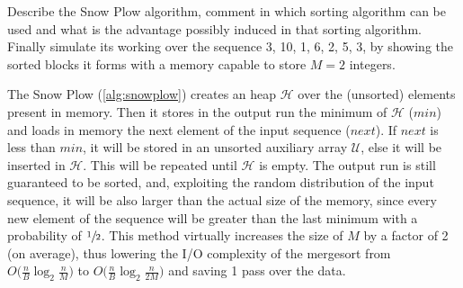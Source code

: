 \exercise

Describe the Snow Plow algorithm, comment in which sorting algorithm can be used
and what is the advantage possibly induced in that sorting algorithm. Finally
simulate its working over the sequence 3, 10, 1, 6, 2, 5, 3, by showing the
sorted blocks it forms with a memory capable to store $M = 2$ integers.

\solution

The Snow Plow (\autoref{alg:snowplow}) creates an heap $\mathcal{H}$ over the
(unsorted) elements present in memory. Then it stores in the output run the
minimum of $\mathcal{H}$ ($min$) and loads in memory the next element of the
input sequence ($next$). If $next$ is less than $min$, it will be stored in an
unsorted auxiliary array $\mathcal{U}$, else it will be inserted in
$\mathcal{H}$. This will be repeated until $\mathcal{H}$ is empty. The output
run is still guaranteed to be sorted, and, exploiting the random distribution of
the input sequence, it will be also larger than the actual size of the memory,
since every new element of the sequence will be greater than the last minimum
with a probability of $\sfrac{1}{2}$. This method virtually increases the size
of $M$ by a factor of 2 (on average), thus lowering the I/O complexity of the
mergesort from $O\big(\frac{n}{B}\log_2\frac{n}{M}\big)$ to
$O\big(\frac{n}{B}\log_2\frac{n}{2M}\big)$ and saving 1 pass over the data.

